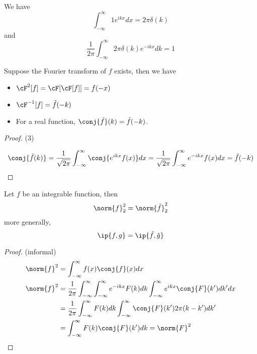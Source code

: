 \begin{refsection}
\begin{corollary}
	We have
	$$\int_{-\infty}^{\infty} 1 e^{ikx}dx = 2\pi \delta(k)$$
	and
	$$\frac{1}{2\pi} \int_{-\infty}^{\infty} 2\pi \delta(k) e^{-ikx}dk = 1$$
\end{corollary}



\begin{lemma}
	
\end{lemma}


\begin{lemma}\cite[269]{prosperetti2013advanced}
	Suppose the Fourier transform of $f$ exists, then we have
	\begin{itemize}
		\item $\cF^2[f] = \cF[\cF[f]] = f(-x)$
		\item $\cF^{-1}[f] = \tilde{f}(-k)$
		\item For a real function, $\conj{\tilde{f}}(k) = \tilde{f}(-k)$.
	\end{itemize}
\end{lemma}
\begin{proof}
	(3)
	
	$$\conj{ \tilde{f}(k)} = \frac{1}{\sqrt{2\pi}} \int_{-\infty}^\infty \conj{e^{ikx}f(x)}dx = \frac{1}{\sqrt{2\pi}} \int_{-\infty}^\infty e^{-ikx}f(x)dx = \tilde{f}(-k)$$
\end{proof}

\begin{lemma}\cite[269]{prosperetti2013advanced}
	\cite[269]{prosperetti2013advanced}Let $f$ be an integrable function, then
	$$\norm{f}_2^2 = \norm{\tilde{f}}_2^2$$
	more generally,
	$$\ip{f,g} = \ip{\tilde{f},\tilde{g}}$$
\end{lemma}
\begin{proof}(informal)
	\begin{align*}
	\norm{f}^2 &= \int_{-\infty}^{\infty} f(x)\conj{f}(x)dx \\ 
	\norm{f}^2 &= \frac{1}{2\pi}\int_{-\infty}^{\infty} \int_{-\infty}^\infty e^{-ikx}F(k)dk\int_{-\infty}^\infty e^{ikx}\conj{F}(k')dk'dx \\ 
	&=\frac{1}{2\pi} \int_{-\infty}^\infty F(k)dk\int_{-\infty}^\infty \conj{F}(k')2\pi(k-k')dk' \\
	&= \int_{-\infty}^\infty F(k)\conj{F}(k')dk = \norm{F}^2
	\end{align*}
\end{proof}




\end{refsection}

